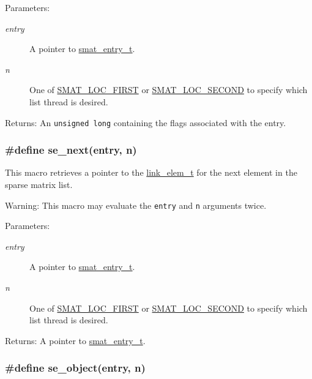 \begin{Desc}
\item[Parameters:]
\begin{description}
\item[{\em entry}]A pointer to \hyperlink{group__dbprim__smat_a2}{smat\_\-entry\_\-t}. \item[{\em n}]One of \hyperlink{group__dbprim__smat_a47a135}{SMAT\_\-LOC\_\-FIRST} or \hyperlink{group__dbprim__smat_a47a136}{SMAT\_\-LOC\_\-SECOND} to specify which list thread is desired.\end{description}
\end{Desc}
\begin{Desc}
\item[Returns:]An {\tt unsigned long} containing the flags associated with the entry. \end{Desc}
\hypertarget{group__dbprim__smat_a43}{
\subsubsection[se\_\-next]{\setlength{\rightskip}{0pt plus 5cm}\#define se\_\-next(entry, n)}}
\label{group__dbprim__smat_a43}


This macro retrieves a pointer to the \hyperlink{group__dbprim__link_a1}{link\_\-elem\_\-t} for the next element in the sparse matrix list.

\begin{Desc}
\item[Warning:]This macro may evaluate the {\tt entry} and {\tt n} arguments twice.\end{Desc}
\begin{Desc}
\item[Parameters:]
\begin{description}
\item[{\em entry}]A pointer to \hyperlink{group__dbprim__smat_a2}{smat\_\-entry\_\-t}. \item[{\em n}]One of \hyperlink{group__dbprim__smat_a47a135}{SMAT\_\-LOC\_\-FIRST} or \hyperlink{group__dbprim__smat_a47a136}{SMAT\_\-LOC\_\-SECOND} to specify which list thread is desired.\end{description}
\end{Desc}
\begin{Desc}
\item[Returns:]A pointer to \hyperlink{group__dbprim__smat_a2}{smat\_\-entry\_\-t}. \end{Desc}
\hypertarget{group__dbprim__smat_a46}{
\subsubsection[se\_\-object]{\setlength{\rightskip}{0pt plus 5cm}\#define se\_\-object(entry, n)}}
\label{group__dbprim__smat_a46}



